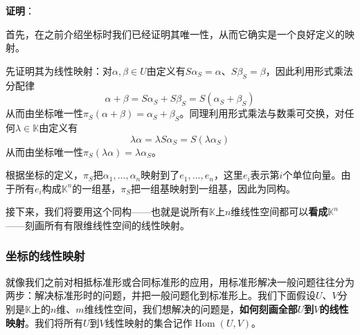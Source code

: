 \documentclass[a4paper,UTF8,fontset=windows,AutoFakeBold]{ctexart}
\DeclareMathOperator{\Hom}{Hom}
\newcommand{\proo}[1]{{\vspace{5pt}\kaishu\noindent\textbf{证明}：\vspace{-3pt}
\begin{compactitem}
    \item[] #1
\end{compactitem}
}}
\begin{document}
\proo{
    首先，在之前介绍坐标时我们已经证明其唯一性，从而它确实是一个良好定义的映射。
    
    先证明其为线性映射：对$\alpha,\beta\in U$由定义有$S\alpha_S=\alpha$、$S\beta_S=\beta$，因此利用形式乘法分配律
    $$\alpha+\beta=S\alpha_S+S\beta_S=S(\alpha_S+\beta_S)$$
    从而由坐标唯一性$\pi_S(\alpha+\beta)=\alpha_S+\beta_S$。同理利用形式乘法与数乘可交换，对任何$\lambda\in\mathbb{K}$由定义有
    $$\lambda\alpha=\lambda S\alpha_S=S(\lambda\alpha_S)$$
    从而由坐标唯一性$\pi_S(\lambda\alpha)=\lambda\alpha_S$。

    根据坐标的定义，$\pi_S$把$\alpha_1,\dots,\alpha_n$映射到了$e_1,\dots,e_n$，这里$e_i$表示第$i$个单位向量。由于所有$e_i$构成$\mathbb{K}^n$的一组基，$\pi_S$把一组基映射到一组基，因此为同构。
}

接下来，我们将要用这个同构——也就是说所有$\mathbb{K}$上$n$维线性空间都可以\textbf{看成}$\mathbb{K}^n$——刻画所有有限维线性空间的线性映射。

\subsubsection{坐标的线性映射}
就像我们之前对相抵标准形或合同标准形的应用，用标准形解决一般问题往往分为两步：解决标准形时的问题，并把一般问题化到标准形上。我们下面假设$U$、$V$分别是$\mathbb{K}$上的$n$维、$m$维线性空间，我们想解决的问题是，\textbf{如何刻画全部$U$到$V$的线性映射}。我们将所有$U$到$V$线性映射的集合记作$\Hom(U,V)$。
\end{document}
